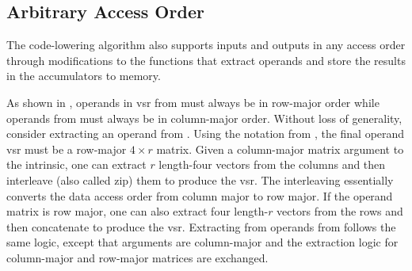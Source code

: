 \documentclass[\main/thesis.tex]{subfiles}
\begin{document}
\subsection{Arbitrary Access Order}
\label{sec:arbitraryOrder}
The code-lowering algorithm also supports inputs and outputs in any access order through modifications to the functions that extract operands and store the results in the accumulators to memory.

As shown in , operands in \gls{vsr} from  must always be in row-major order while operands from  must always be in column-major order.
Without loss of generality, consider extracting an operand from .
Using the notation from , the final operand \gls{vsr} must be a row-major $4 \times r$ matrix.
Given a column-major matrix argument to the intrinsic, one can extract $r$ length-four vectors from the columns and then interleave (also called zip) them to produce the \gls{vsr}.
The interleaving essentially converts the data access order from column major to row major.
If the operand matrix is row major, one can also extract four length-$r$ vectors from the rows and then concatenate to produce the \gls{vsr}.
Extracting from operands from  follows the same logic, except that arguments are column-major and the extraction logic for column-major and row-major matrices are exchanged.
\end{document}
